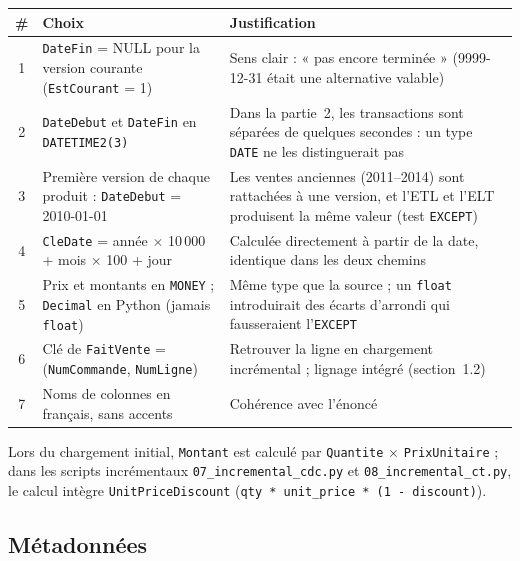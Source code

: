 \documentclass[9pt,a4paper]{article}
\begin{document}
\begingroup\small
\begin{tabularx}{\textwidth}{@{}c>{\raggedright\arraybackslash}p{5.2cm}X@{}}
\toprule
\# & Choix & Justification \\
\midrule
1 & \texttt{DateFin} = NULL pour la version courante (\texttt{EstCourant} = 1) & Sens clair : « pas encore terminée » (9999-12-31 était une alternative valable) \\
2 & \texttt{DateDebut} et \texttt{DateFin} en \texttt{DATETIME2(3)} & Dans la partie~2, les transactions sont séparées de quelques secondes : un type \texttt{DATE} ne les distinguerait pas \\
3 & Première version de chaque produit : \texttt{DateDebut} = 2010-01-01 & Les ventes anciennes (2011--2014) sont rattachées à une version, et l'ETL et l'ELT produisent la même valeur (test \texttt{EXCEPT}) \\
4 & \texttt{CleDate} = année $\times$ 10\,000 + mois $\times$ 100 + jour & Calculée directement à partir de la date, identique dans les deux chemins \\
5 & Prix et montants en \texttt{MONEY} ; \texttt{Decimal} en Python (jamais \texttt{float}) & Même type que la source ; un \texttt{float} introduirait des écarts d'arrondi qui fausseraient l'\texttt{EXCEPT} \\
6 & Clé de \texttt{FaitVente} = (\texttt{NumCommande}, \texttt{NumLigne}) & Retrouver la ligne en chargement incrémental ; lignage intégré (section~1.2) \\
7 & Noms de colonnes en français, sans accents & Cohérence avec l'énoncé \\
\bottomrule
\end{tabularx}
\endgroup

Lors du chargement initial, \texttt{Montant} est calculé par \texttt{Quantite} $\times$ \texttt{PrixUnitaire} ; dans les scripts incrémentaux \texttt{07\_incremental\_cdc.py} et \texttt{08\_incremental\_ct.py}, le calcul intègre \texttt{UnitPriceDiscount} (\texttt{qty * unit\_price * (1 - discount)}).

\subsection{Métadonnées}
\end{document}
